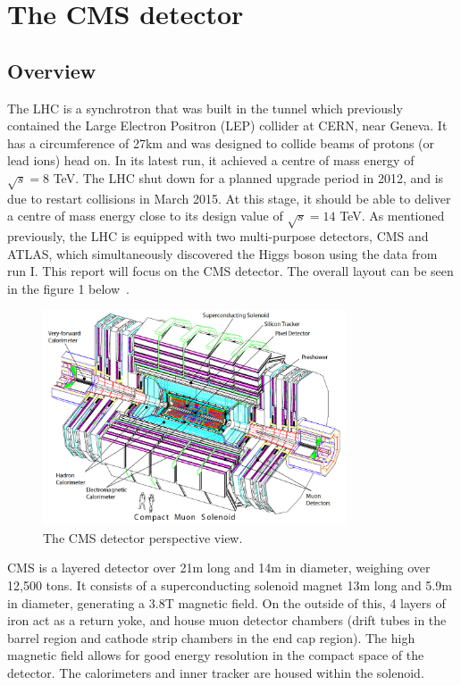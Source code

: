 \documentclass[10pt]{article}
\begin{document}
\section{The CMS detector}

\subsection{Overview}
The LHC is a synchrotron that was built in the tunnel which previously contained the Large Electron Positron (LEP) collider at CERN, near Geneva. It has a circumference of 27km and was designed to collide beams of protons (or lead ions) head on. In its latest run, it achieved a centre of mass energy of $\sqrt{s}=8$ TeV. The LHC shut down for a planned upgrade period in 2012, and is due to restart collisions in March 2015. At this stage, it should be able to deliver a centre of mass energy close to its design value of $\sqrt{s}=14$ TeV. 
As mentioned previously, the LHC is equipped with two multi-purpose detectors, CMS and ATLAS, which simultaneously discovered the Higgs boson using the data from run I. This report will focus on the CMS detector. The overall layout can be seen in the figure 1 below~\cite{CMSTDR}.
\begin{figure}[h]

  \centering
  \includegraphics[width=0.8\textwidth]{"CMSExploded"}
  \caption{The CMS detector perspective view.}
\end{figure}
CMS is a layered detector over 21m long and 14m in diameter, weighing over 12,500 tons. It consists of a superconducting solenoid magnet 13m long and 5.9m in diameter, generating a 3.8T magnetic field. On the outside of this, 4 layers of iron act as a return yoke, and house muon detector chambers (drift tubes in the barrel region and cathode strip chambers in the end cap region). The high magnetic field allows for good energy resolution in the compact space of the detector. The calorimeters and inner tracker are housed within the solenoid. 
\end{document}
